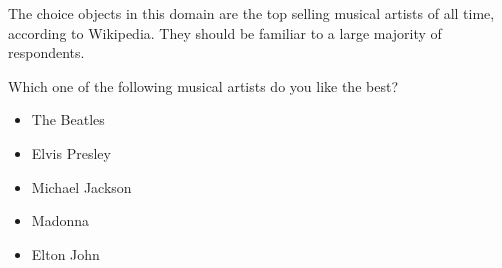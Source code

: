 The choice objects in this domain are the top selling musical artists of all time, according to Wikipedia.
They should be familiar to a large majority of respondents.

\begin{tcolorbox}
Which one of the following musical artists do you like the best?

\begin{itemize}
	\setlength\itemsep{-5pt}
	\item The Beatles
	\item Elvis Presley
	\item Michael Jackson
	\item Madonna
	\item Elton John
\end{itemize}
\end{tcolorbox}
